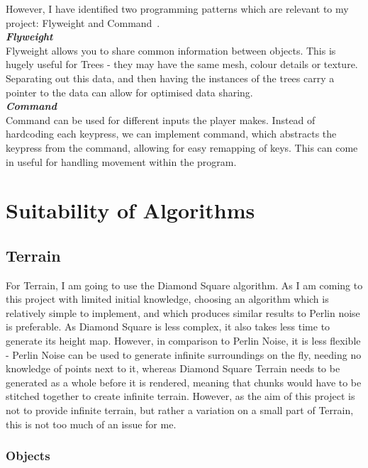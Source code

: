 \documentclass[a4paper,10pt]{report}
\begin{document}
However, I have identified two programming patterns which are relevant to my project: Flyweight and Command~\cite{nystrom2014game}.\\

\emph{\textbf{Flyweight}}\\

Flyweight allows you to share common information between objects. This is hugely useful for Trees - they may have the same mesh, colour details or texture. Separating out this data, and then having the instances of the trees carry a pointer to the data can allow for optimised data sharing. \\

\emph{\textbf{Command}}\\

Command can be used for different inputs the player makes. Instead of hardcoding each keypress, we can implement command, which abstracts the keypress from the command, allowing for easy remapping of keys. This can come in useful for handling movement within the program. 

\section{Suitability of Algorithms}

\subsection{Terrain}

For Terrain, I am going to use the Diamond Square algorithm. As I am coming to this project with limited initial knowledge, choosing an algorithm which is relatively simple to implement, and which produces similar results to Perlin noise is preferable. As Diamond Square is less complex, it also takes less time to generate its height map. However, in comparison to Perlin Noise, it is less flexible - Perlin Noise can be used to generate infinite surroundings on the fly, needing no knowledge of points next to it, whereas Diamond Square Terrain needs to be generated as a whole before it is rendered, meaning that chunks would have to be stitched together to create infinite terrain. However, as the aim of this project is not to provide infinite terrain, but rather a variation on a small part of Terrain, this is not too much of an issue for me. 

\subsubsection{Objects}
\end{document}
